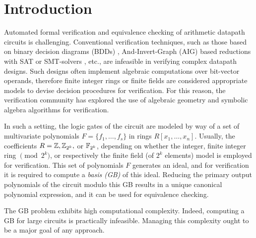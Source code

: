 \section{Introduction}

Automated formal verification and equivalence checking of arithmetic
datapath circuits is challenging. Conventional verification
techniques, such as those based on binary  decision diagrams (BDDs)
\cite{BRYA86}, And-Invert-Graph (AIG) based reductions with SAT or
SMT-solvers \cite{alanmi:cec:iccad2006}, etc., are infeasible in
verifying complex datapath designs. Such designs often implement
algebraic computations over bit-vector operands, therefore finite
integer rings \cite{wienand:cav08} \cite{wedler:date11} or finite
fields \cite{lv:tcad2013} \cite{pruss:tcad}
are considered appropriate models to devise decision
procedures for verification. For this reason, the verification
community has explored the use of algebraic geometry and symbolic
algebra algorithms for verification. 


In such a setting, the logic gates of the circuit are modeled by way
of a set of multivariate polynomials $F=\{f_1,\dots,f_s\}$ in rings
$R[x_1,\dots,x_n]$. Usually, the coefficients $R = {\mathbb{Z}}, {\mathbb{Z}}_{2^k},$ or ${\mathbb{F}}_{2^k}$,
depending on whether the integer, finite integer ring
$\pmod{2^k}$, or respectively the finite field (of $2^k$ elements)
model is employed for verification. This set of polynomials $F$
generates an ideal, and for verification it is required to compute a
{\it \Grobner basis (GB)} \cite{gb_book} of this ideal. Reducing the
primary output polynomials of the circuit modulo this
GB  results in a unique canonical polynomial expression, and it can be
used for equivalence checking.  


The GB problem exhibits high computational complexity. 
Indeed, computing a GB 
for large circuits is practically
infeasible. Managing this complexity ought to be a major goal of any
approach. 


